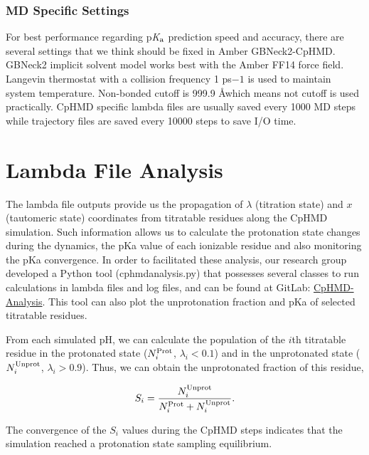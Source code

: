 \documentclass[9pt,tutorial]{livecoms}
\newcommand{\pka}{p\textit{K}$_{\rm a}$}
\begin{document}
\subsubsection{MD Specific Settings}
For best performance regarding {\pka} prediction speed and accuracy, there are several settings that we think should be fixed in Amber GBNeck2-CpHMD. GBNeck2 implicit solvent model works best with the Amber FF14 force field. Langevin thermostat with a collision frequency 1 ps$-1$ is used to maintain system temperature. Non-bonded cutoff is 999.9 \AA which means not cutoff is used practically. CpHMD specific lambda files are usually saved every 1000 MD steps while trajectory files are saved every 10000 steps to save I/O time. 

\section{Lambda File Analysis} %

The lambda file outputs provide us the propagation of $\lambda$ (titration state) and $x$ (tautomeric state) coordinates from titratable residues along the CpHMD simulation. Such information allows us to calculate the protonation state changes during the dynamics, the pKa value of each ionizable residue and also monitoring the pKa convergence. In order to facilitated these analysis, our research group developed a Python tool (cphmdanalysis.py) that possesses several classes to run calculations in lambda files and log files, and can be found at GitLab: \href{https://gitlab.com/shenlab-amber-cphmd/cphmd-analysis}{CpHMD-Analysis}. This tool can also plot the unprotonation fraction and pKa of selected titratable residues.

From each simulated pH, we can calculate the population of the $i$th titratable residue in the protonated state ($N_i^{\rm Prot}$, $\lambda_i < 0.1$) and in the unprotonated state ($N_i^{\rm Unprot}$, $\lambda_i > 0.9$). Thus, we can obtain the unprotonated fraction of this residue, 

\begin{equation}
S_i = \frac{N_i^{\rm Unprot}}{N_i^{\rm Prot} + N_i^{\rm Unprot}}.
\end{equation}

The convergence of the $S_i$ values during the CpHMD steps indicates that the simulation reached a protonation state sampling equilibrium.    
\end{document}
